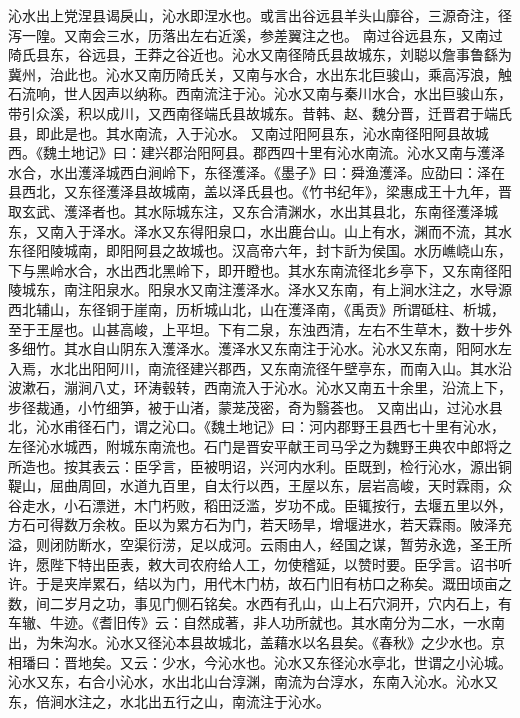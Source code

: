 \documentclass[12pt,UTF8]{ctexbook}
\begin{document}
沁水出上党涅县谒戾山，沁水即涅水也。或言出谷远县羊头山靡谷，三源奇注，径泻一隍。又南会三水，历落出左右近溪，参差翼注之也。
南过谷远县东，又南过陭氏县东，谷远县，王莽之谷近也。沁水又南径陭氏县故城东，刘聪以詹事鲁繇为冀州，治此也。沁水又南历陭氏关，又南与水合，水出东北巨骏山，乘高泻浪，触石流响，世人因声以纳称。西南流注于沁。沁水又南与秦川水合，水出巨骏山东，带引众溪，积以成川，又西南径端氏县故城东。昔韩、赵、魏分晋，迁晋君于端氏县，即此是也。其水南流，入于沁水。
又南过阳阿县东，沁水南径阳阿县故城西。《魏土地记》曰：建兴郡治阳阿县。郡西四十里有沁水南流。沁水又南与濩泽水合，水出濩泽城西白涧岭下，东径濩泽。《墨子》曰：舜渔濩泽。应劭曰：泽在县西北，又东径濩泽县故城南，盖以泽氏县也。《竹书纪年》，梁惠成王十九年，晋取玄武、濩泽者也。其水际城东注，又东合清渊水，水出其县北，东南径濩泽城东，又南入于泽水。泽水又东得阳泉口，水出鹿台山。山上有水，渊而不流，其水东径阳陵城南，即阳阿县之故城也。汉高帝六年，封卞訢为侯国。水历嶕峣山东，下与黑岭水合，水出西北黑岭下，即开瞪也。其水东南流径北乡亭下，又东南径阳陵城东，南注阳泉水。阳泉水又南注濩泽水。泽水又东南，有上涧水注之，水导源西北辅山，东径铜于崖南，历析城山北，山在濩泽南，《禹贡》所谓砥柱、析城，至于王屋也。山甚高峻，上平坦。下有二泉，东浊西清，左右不生草木，数十步外多细竹。其水自山阴东入濩泽水。濩泽水又东南注于沁水。沁水又东南，阳阿水左入焉，水北出阳阿川，南流径建兴郡西，又东南流径午壁亭东，而南入山。其水沿波漱石，漰涧八丈，环涛毂转，西南流入于沁水。沁水又南五十余里，沿流上下，步径裁通，小竹细笋，被于山渚，蒙茏茂密，奇为翳荟也。
又南出山，过沁水县北，沁水甫径石门，谓之沁口。《魏土地记》曰：河内郡野王县西七十里有沁水，左径沁水城西，附城东南流也。石门是晋安平献王司马孚之为魏野王典农中郎将之所造也。按其表云：臣孚言，臣被明诏，兴河内水利。臣既到，检行沁水，源出铜鞮山，屈曲周回，水道九百里，自太行以西，王屋以东，层岩高峻，天时霖雨，众谷走水，小石漂迸，木门朽败，稻田泛滥，岁功不成。臣辄按行，去堰五里以外，方石可得数万余枚。臣以为累方石为门，若天旸旱，增堰进水，若天霖雨。陂泽充溢，则闭防断水，空渠衍涝，足以成河。云雨由人，经国之谋，暂劳永逸，圣王所许，愿陛下特出臣表，敕大司农府给人工，勿使稽延，以赞时要。臣孚言。诏书听许。于是夹岸累石，结以为门，用代木门枋，故石门旧有枋口之称矣。溉田顷亩之数，间二岁月之功，事见门侧石铭矣。水西有孔山，山上石穴洞开，穴内石上，有车辙、牛迹。《耆旧传》云：自然成著，非人功所就也。其水南分为二水，一水南出，为朱沟水。沁水又径沁本县故城北，盖藉水以名县矣。《春秋》之少水也。京相璠曰：晋地矣。又云：少水，今沁水也。沁水又东径沁水亭北，世谓之小沁城。沁水又东，右合小沁水，水出北山台淳渊，南流为台淳水，东南入沁水。沁水又东，倍涧水注之，水北出五行之山，南流注于沁水。
\end{document}
